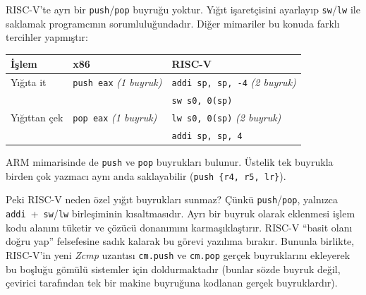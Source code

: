 \begin{karsilastirma}
RISC-V'te ayrı bir \texttt{push}/\texttt{pop} buyruğu yoktur. Yığıt işaretçisini ayarlayıp \texttt{sw}/\texttt{lw} ile saklamak programcının sorumluluğundadır. Diğer mimariler bu konuda farklı tercihler yapmıştır:

\begin{center}
\small
\begin{tabular}{lll}
\toprule
İşlem & x86 & RISC-V \\
\midrule
Yığıta it & \texttt{push eax} \emph{(1 buyruk)} & \texttt{addi sp, sp, -4} \emph{(2 buyruk)} \\
 & & \texttt{sw s0, 0(sp)} \\
Yığıttan çek & \texttt{pop eax} \emph{(1 buyruk)} & \texttt{lw s0, 0(sp)} \emph{(2 buyruk)} \\
 & & \texttt{addi sp, sp, 4} \\
\bottomrule
\end{tabular}
\end{center}

ARM mimarisinde de \texttt{push} ve \texttt{pop} buyrukları bulunur. Üstelik tek buyrukla birden çok yazmacı aynı anda saklayabilir (\texttt{push \{r4, r5, lr\}}).

Peki RISC-V neden özel yığıt buyrukları sunmaz? Çünkü \texttt{push}/\texttt{pop}, yalnızca \texttt{addi}~+~\texttt{sw}/\texttt{lw} birleşiminin kısaltmasıdır. Ayrı bir buyruk olarak eklenmesi işlem kodu alanını tüketir ve çözücü donanımını karmaşıklaştırır. RISC-V ``basit olanı doğru yap'' felsefesine sadık kalarak bu görevi yazılıma bırakır. Bununla birlikte, RISC-V'in yeni \emph{Zcmp} uzantısı \texttt{cm.push} ve \texttt{cm.pop} gerçek buyruklarını ekleyerek bu boşluğu gömülü sistemler için doldurmaktadır (bunlar sözde buyruk değil, çevirici tarafından tek bir makine buyruğuna kodlanan gerçek buyruklardır).
\end{karsilastirma}

